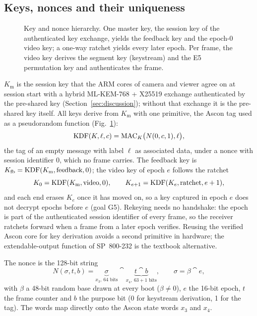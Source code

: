 \subsection{Keys, nonces and their uniqueness}\label{sec:nonce}
\begin{figure}[t]
\centering
\resizebox{0.78\textwidth}{!}{}
\caption{Key and nonce hierarchy. One master key, the session key of the authenticated key exchange, yields the feedback key and the epoch-0 video key; a one-way ratchet yields every later epoch. Per frame, the video key derives the segment key (keystream) and the E5 permutation key and authenticates the frame.}
\label{fig:keys}
\end{figure}
$K_{\mathrm{m}}$ is the session key that the ARM cores of camera and viewer agree on at session start with a hybrid ML-KEM-768 + X25519 exchange authenticated by the pre-shared key (Section~\ref{sec:discussion}); without that exchange it is the pre-shared key itself. All keys derive from $K_{\mathrm{m}}$ with one primitive, the Ascon tag used as a pseudorandom function (Fig.~\ref{fig:keys}):
\begin{equation}
\mathrm{KDF}(K, \ell, c) = \mathrm{MAC}_K\bigl(N(0, c, 1), \ell\bigr),
\label{eq:kdf}
\end{equation}
the tag of an empty message with label $\ell$ as associated data, under a nonce with session identifier $0$, which no frame carries. The feedback key is $K_{\mathrm{fb}} = \mathrm{KDF}(K_{\mathrm{m}}, \text{feedback}, 0)$; the video key of epoch $e$ follows the ratchet
\begin{equation}
K_0 = \mathrm{KDF}(K_{\mathrm{m}}, \text{video}, 0), \qquad K_{e+1} = \mathrm{KDF}(K_e, \text{ratchet}, e+1),
\label{eq:ratchet}
\end{equation}
and each end erases $K_e$ once it has moved on, so a key captured in epoch $e$ does not decrypt epochs before $e$ (goal G5). Rekeying needs no handshake: the epoch is part of the authenticated session identifier of every frame, so the receiver ratchets forward when a frame from a later epoch verifies. Reusing the verified Ascon core for key derivation avoids a second primitive in hardware; the extendable-output function of SP~800-232 is the textbook alternative.

The nonce is the 128-bit string
\begin{equation}
N(\sigma, t, b) = \underbrace{\sigma}_{x_3,\ 64\text{ bits}} \cat \underbrace{t \cat b}_{x_4,\ 63 + 1\text{ bits}},
\qquad \sigma = \beta \cat e,
\label{eq:nonce}
\end{equation}
with $\beta$ a 48-bit random base drawn at every boot ($\beta \ne 0$), $e$ the 16-bit epoch, $t$ the frame counter and $b$ the purpose bit (0 for keystream derivation, 1 for the tag). The words map directly onto the Ascon state words $x_3$ and $x_4$.

